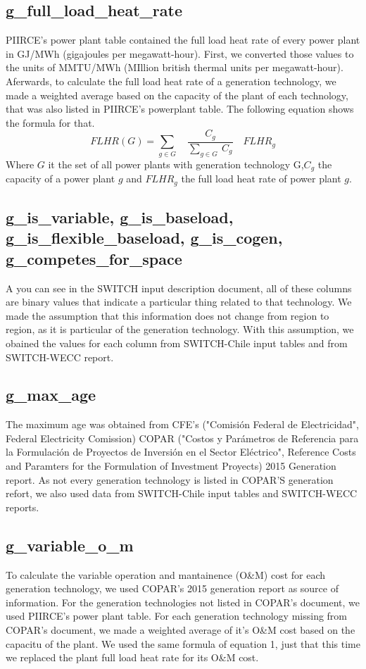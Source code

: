\documentclass[12pt,letterpaper]{article}
\begin{document}
\subsection{g\_full\_load\_heat\_rate}
PIIRCE's power plant table contained the full load heat rate of every power plant in GJ/MWh (gigajoules per megawatt-hour). First, we converted those values to the units of MMTU/MWh (MIllion british thermal units per megawatt-hour). Aferwards, to calculate the full load heat rate of a generation technology, we made a weighted average based on the capacity of the plant of each technology, that was also listed in PIIRCE's powerplant table. The following equation shows the formula for that.
\begin{equation}
FLHR(G)= \sum_{g \in G} \quad \frac{C_g}{\sum_{g \in G}\ C_g}\quad FLHR_g
\end{equation}
Where $G$ it the set of all power plants with generation technology G,$C_g$ the capacity of a power plant $g$ and $FLHR_g$ the full load heat rate of power plant $g$.
\subsection{g\_is\_variable, g\_is\_baseload, g\_is\_flexible\_baseload, g\_is\_cogen, \\ g\_competes\_for\_space}
A you can see in the SWITCH input description document, all of these columns are binary values that indicate a particular thing related to that technology. We made the assumption that this information does not change from region to region, as it is particular of the generation technology. With this assumption, we obained the values for each column from SWITCH-Chile input tables\cite{chile} and from SWITCH-WECC report\cite{wecc}.
\subsection{g\_max\_age}
The maximum age was obtained from CFE's ("Comisión Federal de Electricidad", Federal Electricity Comission) COPAR ("Costos y Parámetros de Referencia para la Formulación de Proyectos de Inversión en el Sector Eléctrico", Reference Costs and Paramters for the Formulation of Investment Proyects) 2015 Generation report\cite{copar}. As not every generation technology is listed in COPAR'S generation refort, we also used data from SWITCH-Chile input tables and SWITCH-WECC reports.
\subsection{g\_variable\_o\_m}
To calculate the variable operation and mantainence (O\&M) cost for each generation technology, we used COPAR's 2015 generation report as source of information.  For the generation technologies not listed in COPAR's document, we used PIIRCE's power plant table. For each generation technology missing from COPAR's document, we made a weighted average of it's O\&M cost based on the capacitu of the plant. We used the same formula of equation 1, just that this time we replaced the plant full load heat rate for its O\&M cost.
\end{document}
